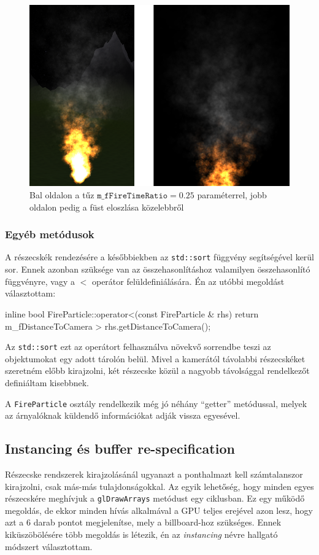 \begin{figure}[h]
 \centering
 \includegraphics[width=\textwidth]{kepek/particleFireSmoke.png}
 \caption{Bal oldalon a tűz $\texttt{m\_fFireTimeRatio} = 0.25$ paraméterrel, jobb oldalon pedig a füst eloszlása közelebbről}
 \label{fig:particleFireSmoke}
\end{figure}

\subsubsection{Egyéb metódusok}
A részecskék rendezésére a későbbiekben az \texttt{std::sort} függvény segítségével kerül sor. Ennek azonban szüksége van az összehasonlításhoz valamilyen összehasonlító függvényre, vagy a $<$ operátor felüldefiniálására. Én az utóbbi megoldást választottam: 
\begin{cpp}
inline bool FireParticle::operator<(const FireParticle & rhs)
{
	return m_fDistanceToCamera > rhs.getDistanceToCamera();
}
\end{cpp}
Az \texttt{std::sort} ezt az operátort felhasználva növekvő sorrendbe teszi az objektumokat egy adott tárolón belül. Mivel a kamerától távolabbi részecskéket szeretném előbb kirajzolni, két részecske közül a nagyobb távolsággal rendelkezőt definiáltam kisebbnek.

A \texttt{FireParticle} osztály rendelkezik még jó néhány ``getter'' metódussal, melyek az árnyalóknak küldendő információkat adják vissza egyesével.

\subsection{Instancing és buffer re-specification}
Részecske rendszerek kirajzolásánál ugyanazt a ponthalmazt kell számtalanszor kirajzolni, csak más-más tulajdonságokkal. Az egyik lehetőség, hogy minden egyes részecskére meghívjuk a \texttt{glDrawArrays} metódust egy ciklusban. Ez egy működő megoldás, de ekkor minden hívás alkalmával a GPU teljes erejével azon lesz, hogy azt a 6 darab pontot megjelenítse, mely a billboard-hoz szükséges. Ennek kiküszöbölésére több megoldás is létezik, én az \textit{instancing} névre hallgató módszert választottam. 

